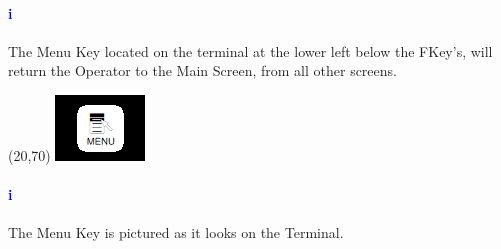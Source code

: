 \paragraph{\textbf{\LARGE \textcolor{blue}{i}}}
The Menu Key located on the terminal at the lower left below the FKey's, will return the Operator to the Main Screen, from all other screens.\\
\begin{minipage}{4cm}
	\begin{picture}(20,70)
	\includegraphics[width=.5\linewidth]{screen-captures/menu}
	\end{picture}
\end{minipage}\begin{minipage}[]{11cm}
	\paragraph{\textbf{\LARGE \textcolor{blue}{i}}} The Menu Key is pictured as it looks on the Terminal.
\end{minipage}
